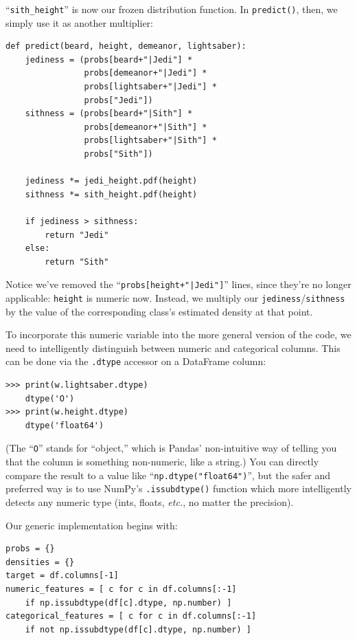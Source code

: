 ``\texttt{sith\_height}'' is now our frozen distribution function. In 
\texttt{predict()}, then, we simply use it as another multiplier:

\begin{Verbatim}[fontsize=\small,samepage=true,frame=single]
def predict(beard, height, demeanor, lightsaber):
    jediness = (probs[beard+"|Jedi"] *
                probs[demeanor+"|Jedi"] *
                probs[lightsaber+"|Jedi"] *
                probs["Jedi"])
    sithness = (probs[beard+"|Sith"] *
                probs[demeanor+"|Sith"] *
                probs[lightsaber+"|Sith"] *
                probs["Sith"])

    jediness *= jedi_height.pdf(height)
    sithness *= sith_height.pdf(height)

    if jediness > sithness:
        return "Jedi"
    else:
        return "Sith"
\end{Verbatim}

Notice we've removed the ``\texttt{probs[height+"|Jedi"]}'' lines,
since they're no longer applicable: \texttt{height} is numeric now. Instead,
we multiply our \texttt{jediness}/\texttt{sithness} by the value of the
corresponding class's estimated density at that point.

To incorporate this numeric variable into the more general version of the
code, we need to intelligently distinguish between numeric and categorical
columns. This can be done via the \texttt{.dtype} accessor on a DataFrame
column:

\begin{Verbatim}[fontsize=\small,samepage=true,frame=single]
>>> print(w.lightsaber.dtype)
    dtype('O')
>>> print(w.height.dtype)
    dtype('float64')
\end{Verbatim}

(The ``\texttt{O}'' stands for ``object,'' which is Pandas' non-intuitive way of
telling you that the column is something non-numeric, like a string.) You can
directly compare the result to a value like ``\texttt{np.dtype("float64")}'',
but the safer and preferred way is to use NumPy's \texttt{.issubdtype()}
function which more intelligently detects any numeric type (ints, floats,
\textit{etc.}, no matter the precision).

Our generic implementation begins with:

\begin{Verbatim}[fontsize=\small,samepage=true,frame=single]
probs = {}
densities = {}
target = df.columns[-1]
numeric_features = [ c for c in df.columns[:-1] 
    if np.issubdtype(df[c].dtype, np.number) ]
categorical_features = [ c for c in df.columns[:-1]
    if not np.issubdtype(df[c].dtype, np.number) ]
\end{Verbatim}

